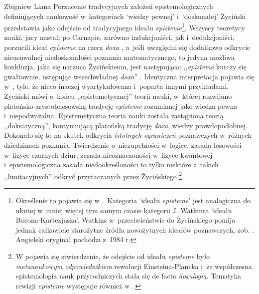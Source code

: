 \begin{artplenv}{Zbigniew Liana}
Porzucenie tradycyjnych założeń epistemologicznych definiujących naukowość w~kategoriach `wiedzy pewnej' i~`doskonałej'
Życiński przedstawia jako odejście od tradycyjnego ideału \textit{episteme}\footnote{Określenie to pojawia się
w~\parencite[s.~102]{zycinski_jezyk_1983}.
Kategoria `ideału \textit{episteme}' jest
analogiczna do ukutej w~mniej więcej tym samym czasie kategorii J. Watkinsa `ideału Bacona-Kartezjusza'. Watkins w~przeciwieństwie
do Życińskiego pomija jednak całkowicie starożytne źródła nowożytnych ideałów poznawczych, zob.
\parencite[s.~31–36]{watkins_nauka_1989}.
Angielski oryginał pochodzi z~1984 r.}.
Wszyscy teoretycy
nauki, jacy nastali po Carnapie, zarówno indukcjoniści, jak i~dedukcjoniści, porzucili ideał \textit{episteme} na rzecz
\textit{doxa}
\parencite[s.~107]{zycinski_jezyk_1983},
a~jeśli uwzględni się dodatkowo odkrycie nieusuwalnej
niedoskonałości poznania matematycznego, to jedyna możliwa konkluzja, jaka się narzuca Życińskiemu, jest następująca:
,,\textit{epist\=em\=e} kurczy się gwałtownie, ustępując wszechwładnej \textit{doxa}''
\parencite[s.~109]{zycinski_jezyk_1983}.
Identyczna interpretacja pojawia się
w~\parencites[s.~12n]{zycinski_structure_1988}[s.~22n]{zycinski_struktura_2013},
tyle, że nieco inaczej wyartykułowana i~poparta innymi przykładami. Życiński mówi o~końcu
,,epistemetycznej'' teorii nauki, w~której rozwijano platońsko-arystotelesowską tradycję \textit{episteme} rozumianej jako
wiedza pewna i~niepodważalna. Epistemetyczna teoria nauki została zastąpiona teorią ,,doksatyczną'', kontynuującą
platońską tradycję \textit{doxa}, wiedzy prawdopodobnej. Dokonało się to na skutek odkrycia \textit{istotnych ograniczeń}
poznawczych w~różnych dziedzinach poznania. Twierdzenie o~niezupełności w~logice, zasada losowości w~fizyce czarnych
dziur, zasada nieoznaczoności w~fizyce kwantowej i~epistemologiczna zasada niedookreśloności to tylko niektóre z~takich
,,limitacyjnych'' odkryć przytaczanych przez Życińskiego
\parencites*[zob.][s.~11]{zycinski_structure_1988}[s.~22n]{zycinski_struktura_2013}\footnote{W
\parencite[s.~129]{zycinski_elementy_1996}
pojawia się stwierdzenie, że
odejście od ideału \textit{episteme} było \textit{metanaukowym odpowiednikiem }rewolucji Einsteina-Plancka i~że współczesna
epistemologia nauk przyrodniczych stała się de facto \textit{doxalogią}. Tematyka rewizji \textit{episteme} występuje
również
w~\parencite[s.~55]{zycinski_granice_1993}.
}.


\end{artplenv}
